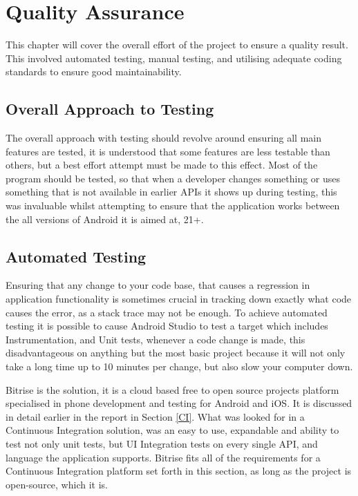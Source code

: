 \chapter{Quality Assurance}
This chapter will cover the overall effort of the project to ensure a quality result. This involved automated testing, manual testing, and utilising adequate coding standards to ensure good maintainability.

\section{Overall Approach to Testing}
The overall approach with testing should revolve around ensuring all main features are tested, it is understood that some features are less testable than others, but a best effort attempt must be made to this effect. Most of the program should be tested, so that when a developer changes something or uses something that is not available in earlier APIs it shows up during testing, this was invaluable whilst attempting to ensure that the application works between the all versions of Android it is aimed at, 21+.

\section{Automated Testing}

Ensuring that any change to your code base, that causes a regression in application functionality is sometimes crucial in tracking down exactly what code causes the error, as a stack trace may not be enough. To achieve automated testing it is possible to cause Android Studio to test a target which includes Instrumentation, and Unit tests, whenever a code change is made, this disadvantageous on anything but the most basic project because it will not only take a long time up to 10 minutes per change, but also slow your computer down. 

Bitrise is the solution, it is a cloud based free to open source projects platform specialised in phone development and testing for Android and iOS. It is discussed in detail earlier in the report in Section \ref{CI}. What was looked for in a Continuous Integration solution, was an easy to use, expandable and ability to test not only unit tests, but UI Integration tests on every single API, and language the application supports. Bitrise fits all of the requirements for a Continuous Integration platform set forth in this section, as long as the project is open-source, which it is.

